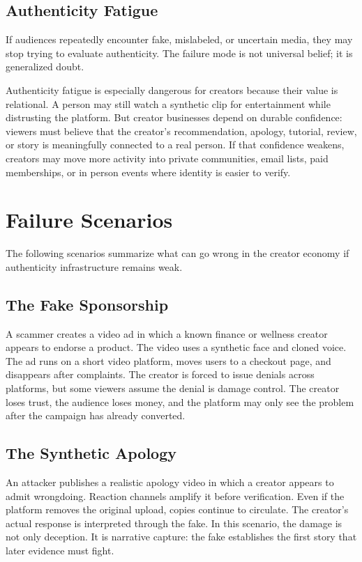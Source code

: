 \documentclass[11pt]{article}
\begin{document}
\subsection{Authenticity Fatigue}

If audiences repeatedly encounter fake, mislabeled, or uncertain media, they may stop trying to evaluate authenticity. The failure mode is not universal belief; it is generalized doubt.

Authenticity fatigue is especially dangerous for creators because their value is relational. A person may still watch a synthetic clip for entertainment while distrusting the platform. But creator businesses depend on durable confidence: viewers must believe that the creator's recommendation, apology, tutorial, review, or story is meaningfully connected to a real person. If that confidence weakens, creators may move more activity into private communities, email lists, paid memberships, or in person events where identity is easier to verify.

\section{Failure Scenarios}

The following scenarios summarize what can go wrong in the creator economy if authenticity infrastructure remains weak.

\subsection{The Fake Sponsorship}

A scammer creates a video ad in which a known finance or wellness creator appears to endorse a product. The video uses a synthetic face and cloned voice. The ad runs on a short video platform, moves users to a checkout page, and disappears after complaints. The creator is forced to issue denials across platforms, but some viewers assume the denial is damage control. The creator loses trust, the audience loses money, and the platform may only see the problem after the campaign has already converted.

\subsection{The Synthetic Apology}

An attacker publishes a realistic apology video in which a creator appears to admit wrongdoing. Reaction channels amplify it before verification. Even if the platform removes the original upload, copies continue to circulate. The creator's actual response is interpreted through the fake. In this scenario, the damage is not only deception. It is narrative capture: the fake establishes the first story that later evidence must fight.
\end{document}
